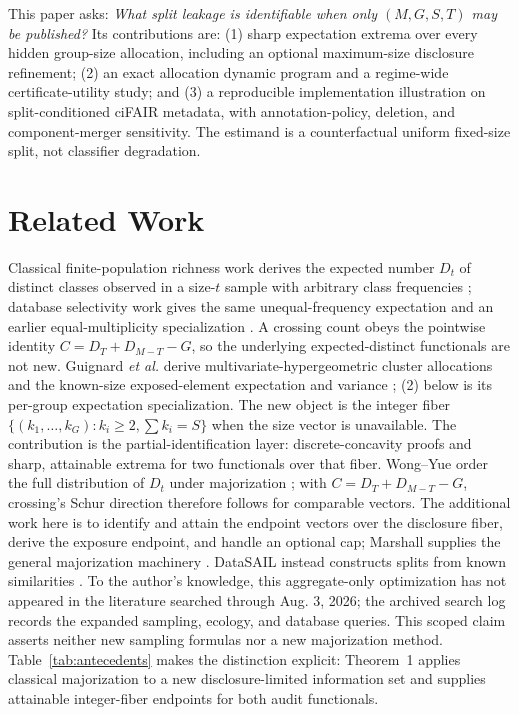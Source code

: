 \documentclass[conference,10pt]{IEEEtran}
\begin{document}
This paper asks: \emph{What split leakage is identifiable when only $(M,G,S,T)$ may be published?} Its contributions are: (1) sharp expectation extrema over every hidden group-size allocation, including an optional maximum-size disclosure refinement; (2) an exact allocation dynamic program and a regime-wide certificate-utility study; and (3) a reproducible implementation illustration on split-conditioned ciFAIR metadata, with annotation-policy, deletion, and component-merger sensitivity. The estimand is a counterfactual uniform fixed-size split, not classifier degradation.

\section{Related Work}
Classical finite-population richness work derives the expected number $D_t$ of distinct classes observed in a size-$t$ sample with arbitrary class frequencies \cite{hurlbert1971,walton1986}; database selectivity work gives the same unequal-frequency expectation and an earlier equal-multiplicity specialization \cite{christodoulakis1989,bitton1983}. A crossing count obeys the pointwise identity $C=D_T+D_{M-T}-G$, so the underlying expected-distinct functionals are not new. Guignard \emph{et al.} derive multivariate-hypergeometric cluster allocations and the known-size exposed-element expectation and variance \cite{guignard2024}; (2) below is its per-group expectation specialization. The new object is the integer fiber $\{(k_1,\ldots,k_G):k_i\geq2,\sum k_i=S\}$ when the size vector is unavailable. The contribution is the partial-identification layer: discrete-concavity proofs and sharp, attainable extrema for two functionals over that fiber. Wong--Yue order the full distribution of $D_t$ under majorization \cite{wong1973}; with $C=D_T+D_{M-T}-G$, crossing's Schur direction therefore follows for comparable vectors. The additional work here is to identify and attain the endpoint vectors over the disclosure fiber, derive the exposure endpoint, and handle an optional cap; Marshall supplies the general majorization machinery \cite{marshall2011}. DataSAIL instead constructs splits from known similarities \cite{joeres2025}. To the author's knowledge, this aggregate-only optimization has not appeared in the literature searched through Aug. 3, 2026; the archived search log records the expanded sampling, ecology, and database queries. This scoped claim asserts neither new sampling formulas nor a new majorization method. Table~\ref{tab:antecedents} makes the distinction explicit: Theorem~1 applies classical majorization to a new disclosure-limited information set and supplies attainable integer-fiber endpoints for both audit functionals.
\end{document}

